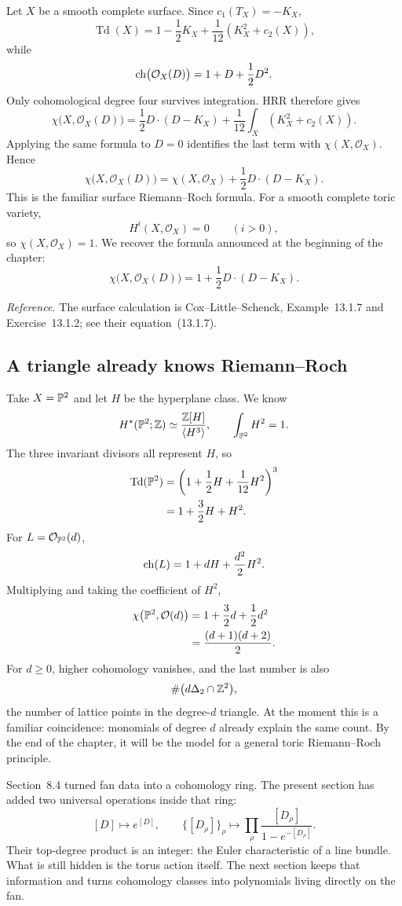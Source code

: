 Let \(X\) be a smooth complete surface. Since \(c_1(T_X)=-K_X\),
\[
\operatorname{Td}(X)
=
1-\frac12K_X
+\frac1{12}(K_X^2+c_2(X)),
\]
while
\[
\operatorname{ch}\bigl(\mathcal O_X(D)\bigr)
=
1+D+\frac12D^2.
\]
Only cohomological degree four survives integration. HRR therefore
gives
\[
\chi\bigl(X,\mathcal O_X(D)\bigr)
=
\frac12D\cdot(D-K_X)
+\frac1{12}\int_X(K_X^2+c_2(X)).
\]
Applying the same formula to \(D=0\) identifies the last term with
\(\chi(X,\mathcal O_X)\). Hence
\[
\boxed{
\chi\bigl(X,\mathcal O_X(D)\bigr)
=
\chi(X,\mathcal O_X)
+\frac12D\cdot(D-K_X).
}
\]
This is the familiar surface Riemann--Roch formula. For a smooth
complete toric variety,
\[
H^i(X,\mathcal O_X)=0\qquad(i>0),
\]
so \(\chi(X,\mathcal O_X)=1\). We recover the formula announced at
the beginning of the chapter:
\[
\boxed{
\chi\bigl(X,\mathcal O_X(D)\bigr)
=
1+\frac12D\cdot(D-K_X).
}
\]

\noindent
\textit{Reference.}
The surface calculation is Cox--Little--Schenck,
Example~13.1.7 and Exercise~13.1.2; see their equation~(13.1.7).

\subsection{A triangle already knows Riemann--Roch}

Take \(X=\mathbb{P}^2\) and let \(H\) be the hyperplane class. We know
\[
H^*(\mathbb{P}^2;\mathbb{Z})
\simeq
\frac{\mathbb{Z}[H]}{\langle H^3\rangle},
\qquad
\int_{\mathbb{P}^2}H^2=1.
\]
The three invariant divisors all represent \(H\), so
\[
\begin{aligned}
\operatorname{Td}(\mathbb{P}^2)
&=
\left(1+\frac12H+\frac1{12}H^2\right)^3\\
&=
1+\frac32H+H^2.
\end{aligned}
\]
For \(L=\mathcal O_{\mathbb{P}^2}(d)\),
\[
\operatorname{ch}(L)
=
1+dH+\frac{d^2}{2}H^2.
\]
Multiplying and taking the coefficient of \(H^2\),
\[
\begin{aligned}
\chi\bigl(\mathbb{P}^2,\mathcal O(d)\bigr)
&=
1+\frac32d+\frac12d^2\\
&=
\frac{(d+1)(d+2)}{2}.
\end{aligned}
\]
For \(d\ge0\), higher cohomology vanishes, and the last number is
also
\[
\#\bigl(d\Delta_2\cap\mathbb{Z}^2\bigr),
\]
the number of lattice points in the degree-\(d\) triangle. At the
moment this is a familiar coincidence: monomials of degree \(d\)
already explain the same count. By the end of the chapter, it will be
the model for a general toric Riemann--Roch principle.

\begin{dictionarytable}
Section~8.4 turned fan data into a cohomology ring. The present section
has added two universal operations inside that ring:
\[
[D]
\longmapsto
e^{[D]},
\qquad
\{[D_\rho]\}_\rho
\longmapsto
\prod_\rho
\frac{[D_\rho]}{1-e^{-[D_\rho]}}.
\]
Their top-degree product is an integer: the Euler characteristic of a
line bundle. What is still hidden is the torus action itself. The next
section keeps that information and turns cohomology classes into
polynomials living directly on the fan.
\end{dictionarytable}

